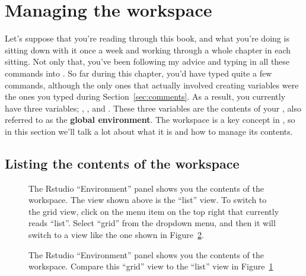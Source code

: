 \section{Managing the workspace\label{sec:workspace}}

Let's suppose that you're reading through this book, and what you're doing is sitting down with it once a week and working through a whole chapter in each sitting. Not only that, you've been following my advice and typing in all these commands into \R. So far during this chapter, you'd have typed quite a few commands, although the only ones that actually involved creating variables were the ones you typed during Section~\ref{sec:comments}. As a result, you currently have three variables; , , and . These three variables are the contents of your , also referred to as the \textbf{global environment}. The workspace is a key concept in \R, so in this section we'll talk a lot about what it is and how to manage its contents.



\subsection{Listing the contents of the workspace}


\begin{figure}[htb]
	\begin{center}
		\caption{The Rstudio ``Environment'' panel shows you the contents of the workspace. The view shown above is the ``list'' view. To switch to the grid view, click on the menu item on the top right that currently reads ``list''. Select ``grid'' from the dropdown menu, and then it will switch to a view like the one shown in Figure~\protect\ref{fig:workspace2}.}
		\label{fig:workspace}
	\end{center}
\end{figure}


\begin{figure}[htb]
	\begin{center}
		\caption{The Rstudio ``Environment'' panel shows you the contents of the workspace. Compare this ``grid'' view to the ``list'' view in Figure~\protect\ref{fig:workspace}}
		\label{fig:workspace2}
	\end{center}
\end{figure}

